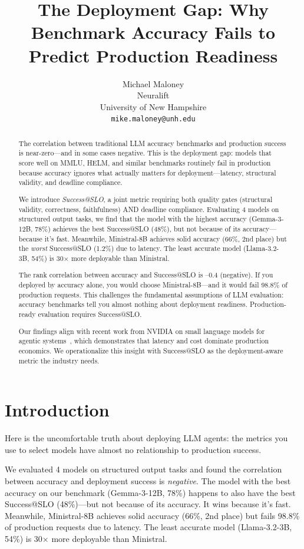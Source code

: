 \documentclass[11pt]{article}
\title{The Deployment Gap: Why Benchmark Accuracy Fails to Predict Production Readiness}
\author{
Michael Maloney \\
Neuralift \\
University of New Hampshire \\
\texttt{mike.maloney@unh.edu}
}
\date{}
\begin{document}
\maketitle

\begin{abstract}
The correlation between traditional LLM accuracy benchmarks and production success is near-zero---and in some cases negative.
This is the deployment gap: models that score well on MMLU, HELM, and similar benchmarks routinely fail in production because accuracy ignores what actually matters for deployment---latency, structural validity, and deadline compliance.

We introduce \emph{Success@SLO}, a joint metric requiring both quality gates (structural validity, correctness, faithfulness) AND deadline compliance.
Evaluating 4 models on structured output tasks, we find that the model with the highest accuracy (Gemma-3-12B, 78\%) achieves the best Success@SLO (48\%), but not because of its accuracy---because it's fast.
Meanwhile, Ministral-8B achieves solid accuracy (66\%, 2nd place) but the \emph{worst} Success@SLO (1.2\%) due to latency.
The least accurate model (Llama-3.2-3B, 54\%) is 30$\times$ more deployable than Ministral.

The rank correlation between accuracy and Success@SLO is --0.4 (negative).
If you deployed by accuracy alone, you would choose Ministral-8B---and it would fail 98.8\% of production requests.
This challenges the fundamental assumptions of LLM evaluation: accuracy benchmarks tell you almost nothing about deployment readiness.
Production-ready evaluation requires Success@SLO.

Our findings align with recent work from NVIDIA on small language models for agentic systems~\citep{nvidia2025slm}, which demonstrates that latency and cost dominate production economics.
We operationalize this insight with Success@SLO as the deployment-aware metric the industry needs.
\end{abstract}

\section{Introduction}

Here is the uncomfortable truth about deploying LLM agents: the metrics you use to select models have almost no relationship to production success.

We evaluated 4 models on structured output tasks and found the correlation between accuracy and deployment success is \emph{negative}.
The model with the best accuracy on our benchmark (Gemma-3-12B, 78\%) happens to also have the best Success@SLO (48\%)---but not because of its accuracy.
It wins because it's fast.
Meanwhile, Ministral-8B achieves solid accuracy (66\%, 2nd place) but fails 98.8\% of production requests due to latency.
The least accurate model (Llama-3.2-3B, 54\%) is 30$\times$ more deployable than Ministral.
\end{document}
